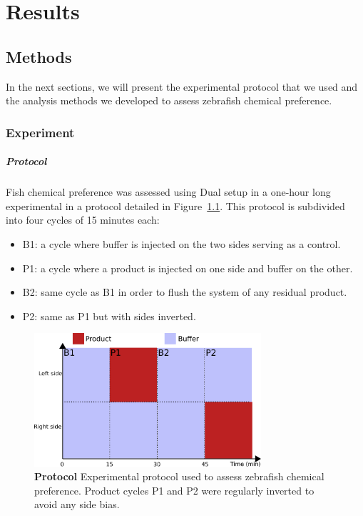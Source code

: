 \chapter{Results}
  \section{Methods}
  In the next sections, we will present the experimental protocol that we used and the analysis methods we developed to assess zebrafish chemical preference.

  \subsection{Experiment}
  \paragraph{Protocol} Fish chemical preference was assessed using Dual setup in a one-hour long experimental in a protocol detailed in Figure~\ref{exp_protocol}. This protocol is subdivided into four cycles of 15 minutes each:
\begin{itemize}
  \item B1: a cycle where buffer is injected on the two sides serving as a control.
  \item P1: a cycle where a product is injected on one side and buffer on the other.
  \item B2: same cycle as B1 in order to flush the system of any residual product.
  \item P2: same as P1 but with sides inverted.
\end{itemize}

    \begin{figure}[htb]
      \centering
      \includegraphics[width=0.75\textwidth]{part_2/assets/protocol.png}
      \caption{\textbf{Protocol} Experimental protocol used to assess zebrafish chemical preference. Product cycles P1 and P2 were regularly inverted to avoid any side bias.}
      \label{exp_protocol}
    \end{figure}

